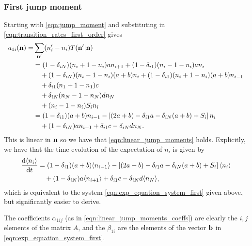 \subsubsection{First jump moment}
Starting with \eqref{eqn:jump_moment} and substituting in
\eqref{eqn:transition_rates_first_order} gives
\begin{equation}
    \begin{aligned}
        a_{1i}(\mathbf{n}) =& \sum_{\mathbf{n}'} (n_i' - n_i) T(\mathbf{n}' | \mathbf{n})\\
        &= (1-\delta_{iN})(n_i + 1 - n_i)a n_{i+1}
        +  (1-\delta_{i1})(n_i - 1 - n_i)a n_i\\
        &\quad+ (1-\delta_{iN})(n_i - 1 - n_i)(a+b) n_i
        +  (1-\delta_{i1})(n_i + 1 - n_i)(a+b) n_{i-1}\\
        &\quad+ \delta_{i1}(n_1 + 1 - n_1) c\\
        &\quad+ \delta_{iN}(n_N - 1 - n_N) d n_N\\
        &\quad+ (n_i - 1 - n_i) S_i n_i\\
        &= (1-\delta_{i1})(a+b)n_{i-1} - \left[(2a+b) - \delta_{i1}a -
        \delta_{iN}(a+b) + S_i\right]n_i\\
        &\quad+ (1-\delta_{iN})an_{i+1} + \delta_{i1}c - \delta_{iN}d n_N.
    \end{aligned}
    \label{eqn:first_jump_mom_first_order}
\end{equation}
This is linear in \(\mathbf{n}\) so we have that \eqref{eqn:linear_jump_moments}
holds. Explicitly, we have that the time evolution of the expectation of \(n_i\)
is given by
\begin{equation}
    \begin{aligned}
        \frac{\mathrm{d} \langle n_i \rangle}{\mathrm{d} t} &= (1-\delta_{i1})(a+b)\langle n_{i-1} \rangle - \left[(2a+b) -
        \delta_{i1}a - \delta_{iN}(a+b) + S_i\right]\langle n_i \rangle\\
        &\quad+(1-\delta_{iN})a\langle n_{i+1} \rangle + \delta_{i1}c - \delta_{iN}d \langle n_N \rangle,
    \end{aligned}
\end{equation}
which is equivalent to the system \eqref{eqn:exp_equation_system_first} given
above, but significantly easier to derive.

The coefficients \(\alpha_{1ij}\) (as in \eqref{eqn:linear_jump_moments_coeffs})
are clearly the \(i,j\) elements of the matrix \(A\), and the \(\beta_{1i}\) are the
elements of the vector \(\mathbf{b}\) in \eqref{eqn:exp_equation_system_first}.

